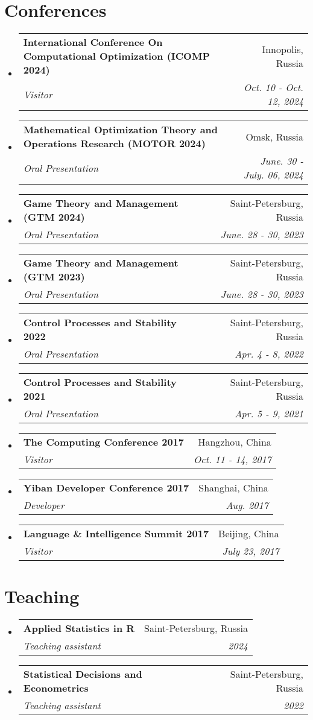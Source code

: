 \documentclass[letterpaper,10pt]{article}
\makeatletter
\newcommand{\resumeSubheading}[4]{
  \vspace{-2pt}\item
  \begin{tabular*}{0.97\textwidth}[t]{l@{\extracolsep{\fill}}r}
    \textbf{#1} & #2 \\
    \textit{\small#3} & \textit{\small #4} \\
  \end{tabular*}\vspace{-7pt}
}
\newenvironment{resumeSubHeadingList}{\begin{itemize}[leftmargin=0.15in, label={}]}{\end{itemize}}
\makeatother
\begin{document}
\section{Conferences}
\begin{resumeSubHeadingList}
\resumeSubheading{International Conference On Computational Optimization (ICOMP 2024)}{Innopolis, Russia}{Visitor}{Oct. 10 - Oct. 12, 2024}
\resumeSubheading{Mathematical Optimization Theory and Operations Research (MOTOR 2024)}{Omsk, Russia}{Oral Presentation}{June. 30 - July. 06, 2024}
\resumeSubheading{Game Theory and Management (GTM 2024)}{Saint-Petersburg, Russia}{Oral Presentation}{June. 28 - 30, 2023}
\resumeSubheading{Game Theory and Management (GTM 2023)}{Saint-Petersburg, Russia}{Oral Presentation}{June. 28 - 30, 2023}
\resumeSubheading{Control Processes and Stability 2022}{Saint-Petersburg, Russia}{Oral Presentation}{Apr. 4 - 8, 2022}
\resumeSubheading{Control Processes and Stability 2021}{Saint-Petersburg, Russia}{Oral Presentation}{Apr. 5 - 9, 2021}
\resumeSubheading{The Computing Conference 2017}{Hangzhou, China}{Visitor}{Oct. 11 - 14, 2017}
\resumeSubheading{Yiban Developer Conference 2017}{Shanghai, China}{Developer}{Aug. 2017}
\resumeSubheading{Language \& Intelligence Summit 2017}{Beijing, China}{Visitor}{July 23, 2017}
\end{resumeSubHeadingList}
\section{Teaching}
\begin{resumeSubHeadingList}
\resumeSubheading{Applied Statistics in R}{Saint-Petersburg, Russia}{Teaching assistant}{2024}
\resumeSubheading{Statistical Decisions and Econometrics}{Saint-Petersburg, Russia}{Teaching assistant}{2022}
\end{resumeSubHeadingList}
\end{document}
